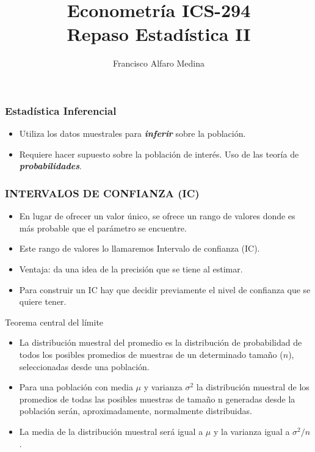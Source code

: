 \documentclass{beamer}
\title[ICS-162]{Econometría ICS-294\\ \small{Repaso Estadística II}}
\author{Francisco Alfaro Medina}
\institute[USM]
{Universidad Técnica Federico Santa María\\ %
	\medskip
	\textit{} %
	
}
\date{}
\begin{document}
\begin{frame}
	\titlepage %
\end{frame}

\begin{frame}
\frametitle{Estadística  Inferencial}

\begin{itemize}
\item  Utiliza los datos muestrales para \textit{\textbf{inferir}} sobre la población.
\item Requiere hacer supuesto sobre la población de interés. Uso de
las teoría de \textit{\textbf{probabilidades}}.
\end{itemize}
\end{frame}

\begin{frame}

\frametitle{INTERVALOS DE CONFIANZA (IC)}
\begin{itemize}
\item En lugar de ofrecer un valor único, se ofrece un rango de valores donde es más probable que el parámetro se encuentre.
\item Este rango de valores lo llamaremos Intervalo de confianza (IC).
\item Ventaja: da una idea de la precisión que se tiene al estimar.
\item Para construir un IC hay que decidir previamente el nivel de confianza que se quiere tener.
\end{itemize}
\end{frame}



\begin{frame}{Teorema central del l\'imite }
    \begin{itemize}
% 
    \item La distribución muestral del promedio es la distribución de probabilidad de todos los posibles promedios de muestras de un determinado tamaño ($n$), seleccionadas desde una población.
        \item Para una población con media $\mu$ y varianza $\sigma^2$ la distribución muestral de los promedios de todas las posibles muestras de tamaño n generadas desde la población serán, aproximadamente, normalmente distribuidas.
        
\item La media de la distribución muestral será igual a $\mu$ y la varianza  igual a $\sigma^2/n$.
    \end{itemize}
\end{frame}
\end{document}

